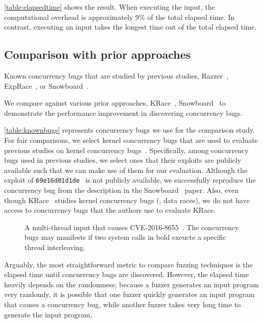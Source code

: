 \autoref{table:elapsedtime} shows the result. When executing the
input, the computational overhead is approximately 9\% of the total
elapsed time. In contrast, executing an input takes the longest time
out of the total elapsed time.
\dr{}



\subsection{Comparison with prior approaches}
\label{ss:comparison}

\begin{table}[t]
  
  \centering
  \caption{Known concurrency bugs that are studied by previous
    studies, Razzer~\cite{razzer}, ExpRace~\cite{exprace}, or
    Snowboard~\cite{snowboard}.}
  \label{table:knownbugs}
\end{table}

We compare \sys against various prior approaches, KRace~\cite{krace},
Snowboard~\cite{snowboard} to demonstrate the performance improvement
in discovering concurrency bugs.

%
\autoref{table:knownbugs} represents concurrency bugs we use for the
comparison study.
%
For fair comparisons, we select kernel concurrency bugs that are used
to evaluate previous studies on kernel concurrency bugs~\cite{exprace,
  razzer, snowboard, krace}.
%
Specifically, among concurrency bugs used in previous studies, we
select ones that their exploits are publicly available such that we
can make use of them for our evaluation.
%
Although the exploit of \texttt{69e16d01d1de}~\cite{snowboardbug} is
not publicly available, we successfully reproduce the concurrency bug
from the description in the Snowboard~\cite{snowboard} paper.
%
Also, even though KRace~\cite{krace} studies kernel concurrency bugs
(\ie, data races), we do not have access to concurrency bugs that the
authors use to evaluate KRace.

%
\begin{figure}[t]
  \caption{A multi-thread input that causes
    CVE-2016-8655~\cite{cve20168655}. The concurrency bugs may
    manifests if two system calls in bold exeucte a specific thread
    interleaving.}
  \label{fig:multithreadinput}
\end{figure}
%
Arguably, the most straightforward metric to compare fuzzing
techniques is the elapsed time until concurrency bugs are discovered.
%
However, the elapsed time heavily depends on the randomness; because a
fuzzer generates an input program very randomly, it is possible that
one fuzzer quickly generates an input program that causes a
concurrency bug, while another fuzzer takes very long time to generate
the input program.

